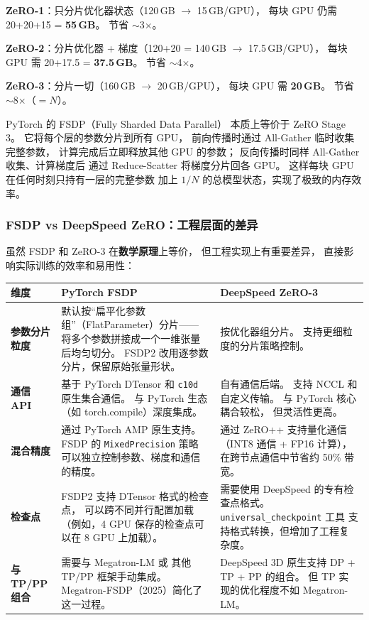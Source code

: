 \textbf{ZeRO-1}：只分片优化器状态（120\,GB $\to$ 15\,GB/GPU），
每块 GPU 仍需 20+20+15 = \textbf{55\,GB}。
节省 $\sim$3$\times$。

\textbf{ZeRO-2}：分片优化器 + 梯度（120+20 = 140\,GB $\to$ 17.5\,GB/GPU），
每块 GPU 需 20+17.5 = \textbf{37.5\,GB}。
节省 $\sim$4$\times$。

\textbf{ZeRO-3}：分片一切（160\,GB $\to$ 20\,GB/GPU），
每块 GPU 需 \textbf{20\,GB}。
节省 $\sim$8$\times$（$= N$）。

PyTorch 的 FSDP（Fully Sharded Data Parallel）
本质上等价于 ZeRO Stage 3。
它将每个层的参数分片到所有 GPU，
前向传播时通过 All-Gather 临时收集完整参数，
计算完成后立即释放其他 GPU 的参数；
反向传播时同样 All-Gather 收集、计算梯度后
通过 Reduce-Scatter 将梯度分片回各 GPU。
这样每块 GPU 在任何时刻只持有一层的完整参数
加上 $1/N$ 的总模型状态，实现了极致的内存效率。

\subsubsection{FSDP vs DeepSpeed ZeRO：工程层面的差异}

虽然 FSDP 和 ZeRO-3 在\textbf{数学原理}上等价，
但工程实现上有重要差异，
直接影响实际训练的效率和易用性：

\begin{center}
\small
\begin{tabular}{p{3cm}p{5.5cm}p{5.5cm}}
\hline
\textbf{维度} & \textbf{PyTorch FSDP} & \textbf{DeepSpeed ZeRO-3} \\
\hline
\textbf{参数分片粒度} &
  默认按``扁平化参数组''（FlatParameter）分片——
  将多个参数拼接成一个一维张量后均匀切分。
  FSDP2 改用逐参数分片，保留原始张量形状。 &
  按优化器组分片。
  支持更细粒度的分片策略控制。 \\
\textbf{通信 API} &
  基于 PyTorch DTensor 和 \texttt{c10d} 原生集合通信。
  与 PyTorch 生态（如 torch.compile）深度集成。 &
  自有通信后端。
  支持 NCCL 和自定义传输。
  与 PyTorch 核心耦合较松，
  但灵活性更高。 \\
\textbf{混合精度} &
  通过 PyTorch AMP 原生支持。
  FSDP 的 \texttt{MixedPrecision} 策略
  可以独立控制参数、梯度和通信的精度。 &
  通过 ZeRO++ 支持量化通信
  （INT8 通信 + FP16 计算），
  在跨节点通信中节省约 50\% 带宽。 \\
\textbf{检查点} &
  FSDP2 支持 DTensor 格式的检查点，
  可以跨不同并行配置加载
  （例如，4 GPU 保存的检查点可以在 8 GPU 上加载）。 &
  需要使用 DeepSpeed 的专有检查点格式。
  \texttt{universal\_checkpoint} 工具
  支持格式转换，但增加了工程复杂度。 \\
\textbf{与 TP/PP 组合} &
  需要与 Megatron-LM 或
  其他 TP/PP 框架手动集成。
  Megatron-FSDP（2025）简化了这一过程。 &
  DeepSpeed 3D 原生支持
  DP + TP + PP 的组合。
  但 TP 实现的优化程度不如 Megatron-LM。 \\
\hline
\end{tabular}
\end{center}

